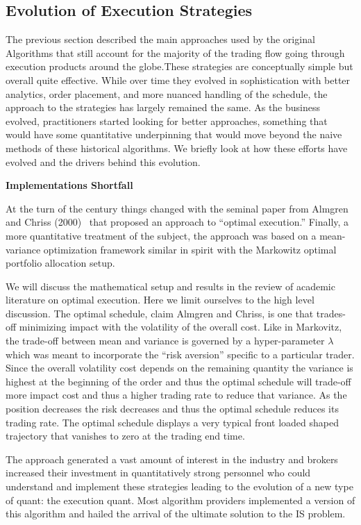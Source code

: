 \subsection{Evolution of Execution Strategies}


The previous section described the main approaches used by the original Algorithms that still account for the majority of the trading flow going through execution products around the globe.These strategies are conceptually simple but overall quite effective. While over time they evolved in sophistication with better analytics, order placement, and more nuanced handling of the schedule, the approach to the strategies has largely remained the same. As the business evolved, practitioners started looking for better approaches, something that would have some quantitative underpinning that would move beyond the naive methods of these historical algorithms. We briefly look at how these efforts have evolved and the drivers behind this evolution. \twomedskip


\noindent\textbf{Implementations Shortfall} \twomedskip

At the turn of the century things changed with the seminal paper from Almgren and Chriss (2000)~\cite{alm2000} that proposed an approach to ``optimal execution.'' Finally, a more quantitative treatment of the subject, the approach was based on a  mean-variance optimization framework similar in spirit with the Markowitz optimal portfolio allocation setup.

We will discuss the  mathematical setup and results in the review of  academic literature on optimal execution. Here we limit ourselves to the high level discussion. The optimal schedule, claim Almgren and Chriss, is one that trades-off minimizing impact with the volatility of the overall cost. Like in Markovitz, the trade-off between mean and variance is governed by a hyper-parameter $\lambda$ which was meant to incorporate the ``risk aversion'' specific to a particular trader. Since the overall volatility cost depends on the remaining quantity the variance is highest at the beginning of the order and thus the optimal schedule will trade-off more impact cost and thus a higher trading rate to reduce that variance. As the position decreases the risk decreases and thus the optimal schedule reduces its trading rate. The optimal schedule displays a very typical front loaded shaped trajectory that vanishes to zero at the trading end time.

The approach generated a vast amount of interest in the industry and brokers increased their investment in quantitatively strong personnel who could understand and implement these strategies leading to the evolution of a new type of quant: the execution quant. Most algorithm providers implemented a version of this algorithm and hailed the arrival of the ultimate solution to the IS problem. 

